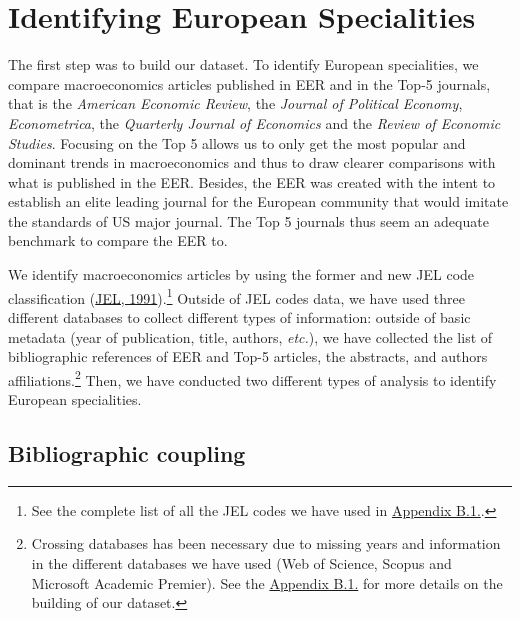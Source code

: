 \documentclass[]{elsarticle} %
\begin{document}
\hypertarget{european-specialities}{%
\section{Identifying European
Specialities}\label{european-specialities}}

The first step was to build our dataset. To identify European
specialities, we compare macroeconomics articles published in EER and in
the Top-5 journals, that is the \emph{American Economic Review}, the
\emph{Journal of Political Economy}, \emph{Econometrica}, the
\emph{Quarterly Journal of Economics} and the \emph{Review of Economic
Studies}. Focusing on the Top 5 allows us to only get the most popular
and dominant trends in macroeconomics and thus to draw clearer
comparisons with what is published in the EER. Besides, the EER was
created with the intent to establish an elite leading journal for the
European community that would imitate the standards of US major journal.
The Top 5 journals thus seem an adequate benchmark to compare the EER
to.

We identify macroeconomics articles by using the former and new JEL code
classification (\protect\hyperlink{ref-jel1991}{JEL, 1991}).\footnote{See
  the complete list of all the JEL codes we have used in
  \protect\hyperlink{eer-top5-macro}{Appendix B.1.}.} Outside of JEL
codes data, we have used three different databases to collect different
types of information: outside of basic metadata (year of publication,
title, authors, \emph{etc.}), we have collected the list of
bibliographic references of EER and Top-5 articles, the abstracts, and
authors affiliations.\footnote{Crossing databases has been necessary due
  to missing years and information in the different databases we have
  used (Web of Science, Scopus and Microsoft Academic Premier). See the
  \protect\hyperlink{corpus}{Appendix B.1.} for more details on the
  building of our dataset.} Then, we have conducted two different types
of analysis to identify European specialities.

\hypertarget{bibliographic-coupling}{%
\subsection{Bibliographic coupling}\label{bibliographic-coupling}}
\end{document}
